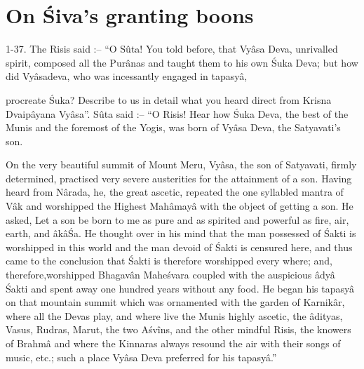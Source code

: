 \chapter{On \'Siva’s granting boons}

1-37. The Risis said :-- ``O S\^uta! You told before, that Vy\^asa Deva, unrivalled spirit, composed all the Pur\^anas and taught them to his own \'Suka Deva; but how did Vy\^asadeva, who was incessantly engaged in tapasy\^a,

procreate \'Suka? Describe to us in detail what you heard direct from Krisna Dvaip\^ayana Vy\^asa''. S\^uta said :-- ``O Risis! Hear how \'Suka Deva, the best of the Munis and the foremost of the Yogis, was born of Vy\^asa Deva, the Satyavati's son.

On the very beautiful summit of Mount Meru, Vy\^asa, the son of Satyavati, firmly determined, practised very severe austerities for the attainment of a son. Having heard from N\^arada, he, the great ascetic, repeated the one syllabled mantra of V\^ak and worshipped the Highest Mah\^amay\^a with the object of getting a son. He asked, Let a son be born to me as pure and as spirited and powerful as fire, air, earth, and \^ak\^a\'Sa. He thought over in his mind that the man possessed of \'Sakti is worshipped in this world and the man devoid of \'Sakti is censured here, and thus came to the conclusion that \'Sakti is therefore worshipped every where; and, therefore,worshipped Bhagav\^an Mahe\'svara coupled with the auspicious \^ady\^a \'Sakti and spent away one hundred years without any food. He began his tapasy\^a on that mountain summit which was ornamented with the garden of Karnik\^ar, where all the Devas play, and where live the Munis highly ascetic, the \^adityas, Vasus, Rudras, Marut, the two A\'sv\^ins, and the other mindful Risis, the knowers of Brahm\^a and where the Kinnaras always resound the air with their songs of music, etc.; such a place Vy\^asa Deva preferred for his tapasy\^a.''

